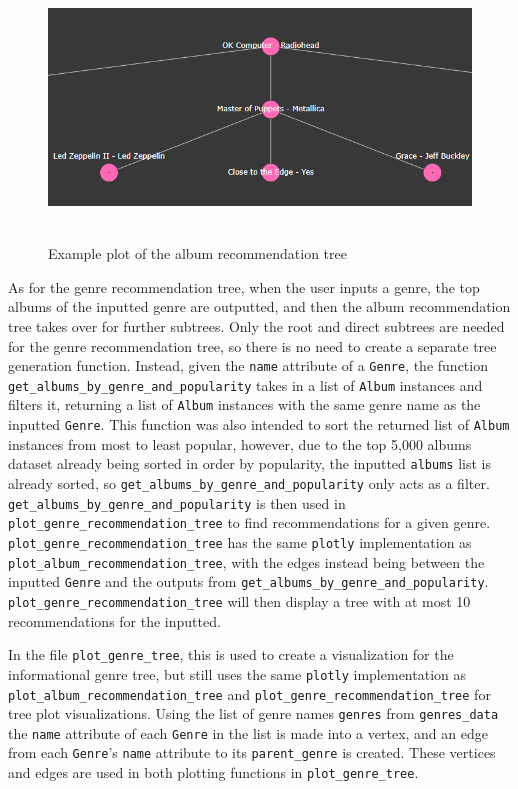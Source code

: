 \documentclass[fontsize=11pt]{article}
\begin{document}
\begin{figure}[h]
    \centering
    \includegraphics[height=7cm, width=13cm]{exampletree.png}
    \caption{Example plot of the album recommendation tree}
    \label{fig:my_label}
\end{figure}

As for the genre recommendation tree, when the user inputs a genre, the top albums of the inputted genre are outputted, and then the album recommendation tree takes over for further subtrees. Only the root and direct subtrees are needed for the genre recommendation tree, so there is no need to create a separate tree generation function. Instead, given the \texttt{name} attribute of a \texttt{Genre}, the function \texttt{get\_albums\_by\_genre\_and\_popularity} takes in a list of \texttt{Album} instances and filters it, returning a list of \texttt{Album} instances with the same genre name as the inputted \texttt{Genre}. This function was also intended to sort the returned list of \texttt{Album} instances from most to least popular, however, due to the top 5,000 albums dataset already being sorted in order by popularity, the inputted \texttt{albums} list is already sorted, so \texttt{get\_albums\_by\_genre\_and\_popularity} only acts as a filter. \texttt{get\_albums\_by\_genre\_and\_popularity} is then used in \texttt{plot\_genre\_recommendation\_tree} to find recommendations for a given genre. \texttt{plot\_genre\_recommendation\_tree} has the same \texttt{plotly} implementation as \texttt{plot\_album\_recommendation\_tree}, with the edges instead being between the inputted \texttt{Genre} and the outputs from \texttt{get\_albums\_by\_genre\_and\_popularity}. \texttt{plot\_genre\_recommendation\_tree} will then display a tree with at most 10 recommendations for the inputted. \newline

In the file \texttt{plot\_genre\_tree}, this is used to create a visualization for the informational genre tree, but still uses the same \texttt{plotly} implementation as \texttt{plot\_album\_recommendation\_tree} and \texttt{plot\_genre\_recommendation\_tree} for tree plot visualizations. Using the list of genre names \texttt{genres} from \texttt{genres\_data} the \texttt{name} attribute of each \texttt{Genre} in the list is made into a vertex, and an edge from each \texttt{Genre}'s \texttt{name} attribute to its \texttt{parent\_genre} is created. These vertices and edges are used in both plotting functions in \texttt{plot\_genre\_tree}. \newline
\end{document}
